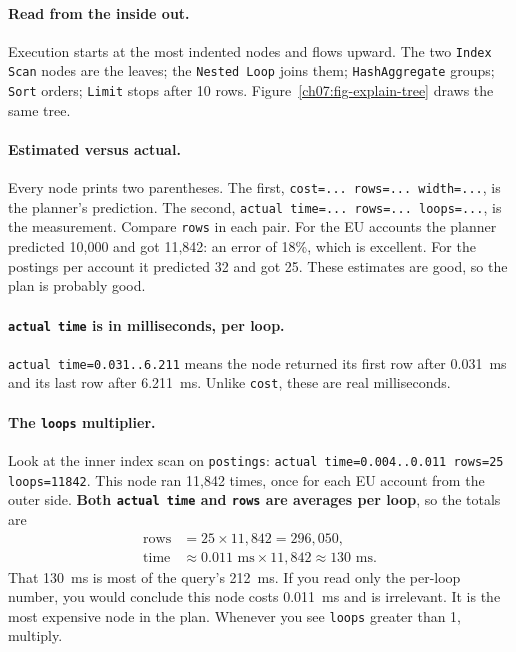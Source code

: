 \paragraph{Read from the inside out.} Execution starts at the most indented nodes and flows upward. The two \texttt{Index Scan} nodes are the leaves; the \texttt{Nested Loop} joins them; \texttt{HashAggregate} groups; \texttt{Sort} orders; \texttt{Limit} stops after 10 rows. Figure~\ref{ch07:fig-explain-tree} draws the same tree.

\paragraph{Estimated versus actual.} Every node prints two parentheses. The first, \texttt{cost=... rows=... width=...}, is the planner's prediction. The second, \texttt{actual time=... rows=... loops=...}, is the measurement. Compare \texttt{rows} in each pair. For the EU accounts the planner predicted 10,000 and got 11,842: an error of 18\%, which is excellent. For the postings per account it predicted 32 and got 25. These estimates are good, so the plan is probably good.

\paragraph{\texttt{actual time} is in milliseconds, per loop.} \texttt{actual time=0.031..6.211} means the node returned its first row after 0.031~ms and its last row after 6.211~ms. Unlike \texttt{cost}, these are real milliseconds.

\paragraph{The \texttt{loops} multiplier.} Look at the inner index scan on \texttt{postings}: \texttt{actual time=0.004..0.011 rows=25 loops=11842}. This node ran 11,842 times, once for each EU account from the outer side. \textbf{Both \texttt{actual time} and \texttt{rows} are averages per loop}, so the totals are
\begin{align*}
  \text{rows} &= 25 \times 11{,}842 = 296{,}050, \\
  \text{time} &\approx 0.011\text{ ms} \times 11{,}842 \approx 130\text{ ms}.
\end{align*}
That 130~ms is most of the query's 212~ms. If you read only the per-loop number, you would conclude this node costs 0.011~ms and is irrelevant. It is the most expensive node in the plan. Whenever you see \texttt{loops} greater than 1, multiply.

